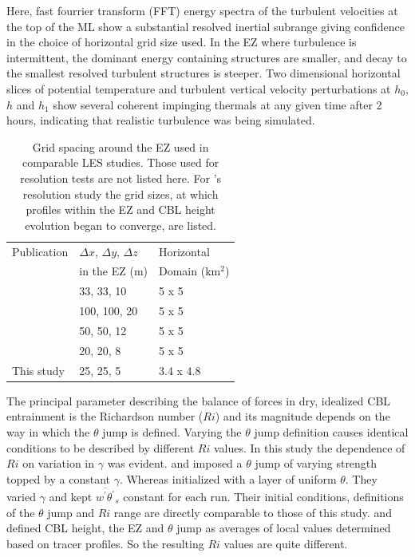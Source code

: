Here, fast fourrier transform (FFT) energy spectra of the turbulent velocities at the top of the ML show a substantial resolved inertial subrange giving confidence in the choice of horizontal grid size used. In the EZ where turbulence is intermittent, the dominant energy containing structures are smaller, and decay to the smallest resolved turbulent structures is steeper. Two dimensional horizontal slices of potential temperature and turbulent vertical velocity perturbations at $h_{0}$, $h$ and $h_{1}$ show several coherent impinging thermals at any given time after 2 hours, indicating that realistic turbulence was being simulated.\\

\begin{table}[htbp]
\caption[Comparison of Grid-Sizes used in similar Studies]{Grid spacing around the EZ used in comparable LES studies. Those used for resolution tests are not listed here.  For \cite{SullPat}'s resolution study the grid sizes, at which profiles within the EZ and CBL height evolution began to converge, are listed.}

    \begin{tabular}{p{4cm} p{2cm} p{2cm}}
Publication & $\Delta x$, $\Delta y$, $\Delta z$ & Horizontal \\
 & in the EZ (m) & Domain (km$^{2}$) \\ \hline
      \cite{SullMoengStev}& 33, 33, 10 & 5 x 5 \\ 
      \cite{FedConzMir04}& 100, 100, 20 & 5 x 5 \\ 
      \cite{BrooksFowler2}& 50, 50, 12 & 5 x 5 \\
      \cite{SullPat} &  20, 20, 8 & 5 x 5\\
      This study & 25, 25, 5 &  3.4 x 4.8\\ \hline       
    \end{tabular}
\label{table:gridcomp}   
\end{table}

The principal parameter describing the balance of forces in dry, idealized CBL entrainment is the Richardson number ($Ri$) and its magnitude depends on the way in which the $\theta$ jump is defined.  Varying the $\theta$ jump definition causes identical conditions to be described by different $Ri$ values.  In this study the dependence of $Ri$ on variation in $\gamma$ was evident.  \cite{BrooksFowler2} and \cite{SullMoengStev} imposed a $\theta$ jump of varying strength topped by a constant $\gamma$.  Whereas \cite{FedConzMir04} initialized with a layer of uniform $\theta$.  They varied $\gamma$ and kept $\overline{w^{'}\theta^{'}}_{s}$ constant for each run.  Their initial conditions, definitions of the $\theta$ jump and $Ri$ range are directly comparable to those of this study.  \cite{BrooksFowler2} and \cite{SullMoengStev} defined CBL height, the EZ and $\theta$ jump as averages of local values determined based on tracer profiles.  So the resulting $Ri$ values are quite different.    

